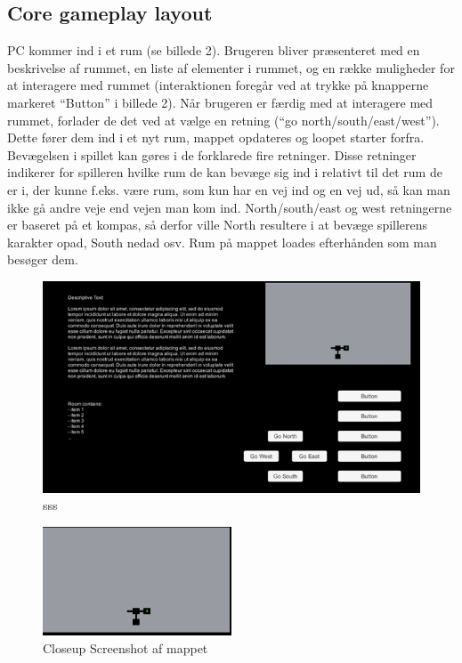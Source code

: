 \subsection{Core gameplay layout}
PC kommer ind i et rum (se billede 2).  Brugeren bliver præsenteret med en beskrivelse af rummet, en liste af elementer i rummet, og en række muligheder for at interagere med rummet (interaktionen foregår ved at trykke på knapperne markeret “Button” i billede 2). Når brugeren er færdig med at interagere med rummet, forlader de det ved at vælge en retning (“go north/south/east/west”). 
Dette fører dem ind i et nyt rum, mappet opdateres og loopet starter forfra.
Bevægelsen i spillet kan gøres i de forklarede fire retninger. Disse retninger indikerer for spilleren hvilke rum de kan bevæge sig ind i relativt til det rum de er i, der kunne f.eks. være rum, som kun har en vej ind og en vej ud, så kan man ikke gå andre veje end vejen man kom ind. North/south/east og west retningerne er baseret på et kompas, så derfor ville North resultere i at bevæge spillerens karakter opad, South nedad osv.
Rum på mappet loades efterhånden som man besøger dem.

\begin{figure}[H]
\centering
\includegraphics[width = \textwidth]{02-Body/Images/SpilLayout-udkast.png}
\caption{sss}
\label{fig:Spillayout-udkast}
\end{figure}

\begin{figure}[H]
\centering
\includegraphics[width = 0.5\textwidth]{02-Body/Images/Map-closeup.png}
\caption{Closeup Screenshot af mappet}
\label{fig:Spillayout-udkast}
\end{figure}

